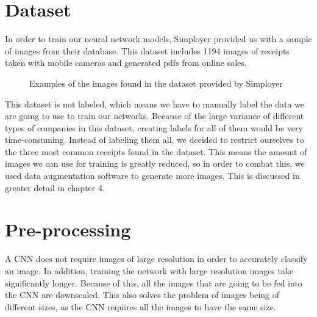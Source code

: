 \section{Dataset}\label{sec:dataset}
In order to train our neural network models, Simployer provided us with a sample of images from their database.
This dataset includes 1194 images of receipts taken with mobile cameras and generated pdfs from online sales.

\begin{figure}[h]
    \caption{Examples of the images found in the dataset provided by Simployer}
    \label{fig:figure3.2}
\end{figure}

This dataset is not labeled, which means we have to manually label the data we are going to use to train our networks.
Because of the large variance of different types of companies in this dataset, creating labels for all of them would be very time-consuming.
Instead of labeling them all, we decided to restrict ourselves to the three most common receipts found in the dataset.
This means the amount of images we can use for training is greatly reduced, so in order to combat this, we used data augmentation software to generate more images.
This is discussed in greater detail in chapter 4.

\section{Pre-processing}\label{sec:pre-processing}
A CNN does not require images of large resolution in order to accurately classify an image.
In addition, training the network with large resolution images take significantly longer.
Because of this, all the images that are going to be fed into the CNN are downscaled.
This also solves the problem of images being of different sizes, as the CNN requires all the images to have the same size.

